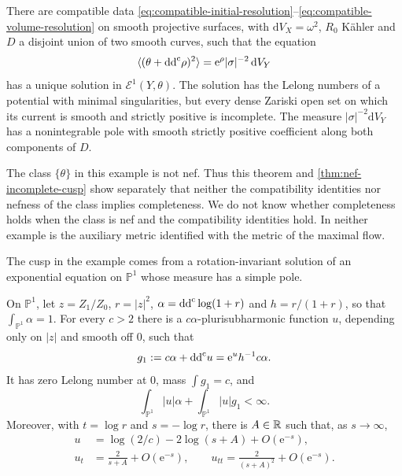 \begin{theorem}\label{thm:flow-compatible-incomplete-metric}
There are compatible data \eqref{eq:compatible-initial-resolution}--\eqref{eq:compatible-volume-resolution} on smooth projective surfaces, with $\mathrm{d}V_X=\omega^2$, $R_0$ K\"ahler and $D$ a disjoint union of two smooth curves, such that the equation
\begin{equation}\label{eq:compatible-incomplete-equation}
 \langle(\theta+\mathrm{dd}^{\mathrm{c}}\rho)^2\rangle
 =\mathrm{e}^{\rho}|\sigma|^{-2}\,\mathrm{d}V_Y
\end{equation}
has a unique solution in $\mathcal E^1(Y,\theta)$. The solution has the Lelong numbers of a potential with minimal singularities, but every dense Zariski open set on which its current is smooth and strictly positive is incomplete. The measure $|\sigma|^{-2}\mathrm{d}V_Y$ has a nonintegrable pole with smooth strictly positive coefficient along both components of $D$.
\end{theorem}

The class $\{\theta\}$ in this example is not nef. Thus this theorem and \cref{thm:nef-incomplete-cusp} show separately that neither the compatibility identities nor nefness of the class implies completeness. We do not know whether completeness holds when the class is nef and the compatibility identities hold. In neither example is the auxiliary metric identified with the metric of the maximal flow.

The cusp in the example comes from a rotation-invariant solution of an exponential equation on $\mathbb P^1$ whose measure has a simple pole.

\begin{lemma}\label{lem:fixed-volume-curve-cusp}
On $\mathbb P^1$, let $z=Z_1/Z_0$, $r=|z|^2$, $\alpha=\mathrm{dd}^{\mathrm{c}}\log(1+r)$ and $h=r/(1+r)$, so that $\int_{\mathbb P^1}\alpha=1$. For every $c>2$ there is a $c\alpha$-plurisubharmonic function $u$, depending only on $|z|$ and smooth off $0$, such that
\begin{equation}\label{eq:fixed-volume-curve-cusp}
 g_1:=c\alpha+\mathrm{dd}^{\mathrm{c}} u=\mathrm{e}^{u}h^{-1}c\alpha.
\end{equation}
It has zero Lelong number at $0$, mass $\int g_1=c$, and
\[
 \int_{\mathbb P^1}|u|\alpha+\int_{\mathbb P^1}|u|g_1<\infty.
\]
Moreover, with $t=\log r$ and $s=-\log r$, there is $A\in\mathbb R$ such that, as $s\to\infty$,
\[
 \begin{aligned}
 u&=\log(2/c)-2\log(s+A)+O(\mathrm{e}^{-s}),\\
 u_t&=\frac{2}{s+A}+O(\mathrm{e}^{-s}),\qquad
 u_{tt}=\frac{2}{(s+A)^2}+O(\mathrm{e}^{-s}).
 \end{aligned}
\]
\end{lemma}

